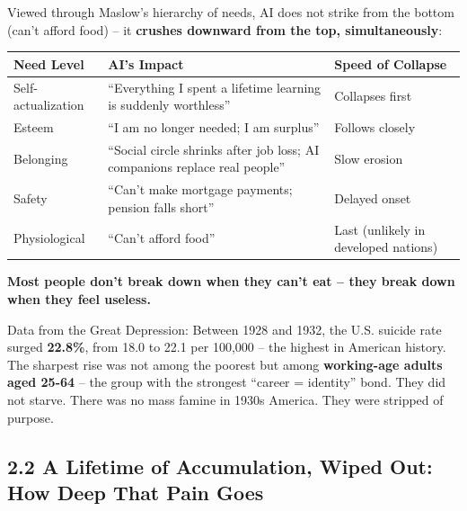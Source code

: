 Viewed through Maslow's hierarchy of needs, AI does not strike from the
bottom (can't afford food) -- it \textbf{crushes downward from the top,
simultaneously}:

{\def\LTcaptype{none} %
\begin{longtable}[]{@{}
  >{\raggedright\arraybackslash}p{}
  >{\raggedright\arraybackslash}p{}
  >{\raggedright\arraybackslash}p{}@{}}
\toprule\noalign{}
\begin{minipage}[b]{\linewidth}\raggedright
Need Level
\end{minipage} & \begin{minipage}[b]{\linewidth}\raggedright
AI's Impact
\end{minipage} & \begin{minipage}[b]{\linewidth}\raggedright
Speed of Collapse
\end{minipage} \\
\midrule\noalign{}
\endhead
\bottomrule\noalign{}
\endlastfoot
Self-actualization & ``Everything I spent a lifetime learning is
suddenly worthless'' & Collapses first \\
Esteem & ``I am no longer needed; I am surplus'' & Follows closely \\
Belonging & ``Social circle shrinks after job loss; AI companions
replace real people'' & Slow erosion \\
Safety & ``Can't make mortgage payments; pension falls short'' & Delayed
onset \\
Physiological & ``Can't afford food'' & Last (unlikely in developed
nations) \\
\end{longtable}
}

\textbf{Most people don't break down when they can't eat -- they break
down when they feel useless.}

Data from the Great Depression: Between 1928 and 1932, the U.S. suicide
rate surged \textbf{22.8\%}, from 18.0 to 22.1 per 100,000 -- the
highest in American history. The sharpest rise was not among the poorest
but among \textbf{working-age adults aged 25-64} -- the group with the
strongest ``career = identity'' bond. They did not starve. There was no
mass famine in 1930s America. They were stripped of purpose.

\subsection{2.2 A Lifetime of Accumulation, Wiped Out: How Deep That
Pain
Goes}\label{a-lifetime-of-accumulation-wiped-out-how-deep-that-pain-goes}

